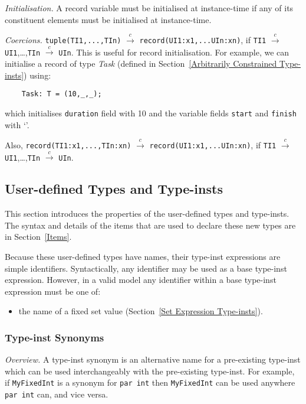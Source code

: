 \documentclass[10pt]{scrartcl}
\newcommand{\underscore}{\texttt{\n{}}}
\newcommand{\TyThing}[1]{\vspace{1.2mm}\noindent\emph{#1} }
\newcommand{\TyOverview}{\TyThing{Overview.}}
\newcommand{\TyInit}{\TyThing{Initialisation.}}
\newcommand{\TyCoercions}{\TyThing{Coercions.}}
\newcommand{\coerce}[2]{#1 $\stackrel{c}{\rightarrow}$ #2}
\begin{document}
{\TyInit
A record variable must be initialised at instance-time if any of its
constituent elements must be initialised at instance-time.

\TyCoercions
\coerce{\texttt{tuple(TI1,...,TIn)}}{\texttt{record(UI1:x1,...UIn:xn)}}, if
\coerce{\texttt{TI1}}{\texttt{UI1}},\ldots,\coerce{\texttt{TIn}}{\texttt{UIn}}.
This is useful for record initialisation.  For example, we can initialise a
record of type \emph{Task} (defined in Section~\ref{Arbitrarily
Constrained Type-insts}) using:
\begin{verbatim}
    Task: T = (10,_,_);
\end{verbatim}
which initialises \texttt{duration} field with 10 and the variable
fields \texttt{start} and \texttt{finish} with `\underscore'.

Also,
\coerce{\texttt{record(TI1:x1,...,TIn:xn)}}
       {\texttt{record(UI1:x1,...UIn:xn)}}, if
\coerce{\texttt{TI1}}{\texttt{UI1}},\ldots,\coerce{\texttt{TIn}}{\texttt{UIn}}.

\subsection{User-defined Types and Type-insts}
     \label{User-defined Types}
This section introduces the properties of the user-defined types and
type-insts.  The syntax and details of the items that are used to declare
these new types are in Section~\ref{Items}.

Because these user-defined types have names, their type-inst expressions
are simple identifiers.  Syntactically, any identifier may be used as a base
type-inst expression.  However, in a valid model any identifier within a
base type-inst expression must be one of:
\begin{itemize}
\item the name of a fixed set value (Section~\ref{Set Expression Type-insts}).
\end{itemize}


\subsubsection{Type-inst Synonyms}
        \label{Type-inst Synonyms}
\TyOverview
A type-inst synonym is an alternative name for a pre-existing type-inst
which can be used interchangeably with the pre-existing type-inst.
For example, if \texttt{MyFixedInt} is a synonym for \texttt{par int} then
\texttt{MyFixedInt} can be used anywhere \texttt{par int} can, and vice versa.

}
\end{document}
